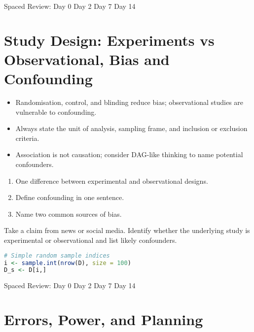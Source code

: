 \documentclass[11pt,a4paper]{article}
\def\textbf#1{#1}%
\newcommand{\reviewticks}{
  \vspace{0.4em}
  \noindent\scriptsize\textbf{Spaced Review:}
  \fbox{\phantom{D0}} Day 0\quad
  \fbox{\phantom{D2}} Day 2\quad
  \fbox{\phantom{D7}} Day 7\quad
  \fbox{\phantom{D14}} Day 14
}
\begin{document}
\reviewticks

\section{Study Design: Experiments vs Observational, Bias and Confounding}

\begin{corebox}
\begin{itemize}
  \item Randomisation, control, and blinding reduce bias; observational studies are vulnerable to confounding.
  \item Always state the unit of analysis, sampling frame, and inclusion or exclusion criteria.
  \item Association is not causation; consider DAG-like thinking to name potential confounders.
\end{itemize}
\end{corebox}

\begin{recallbox}
\begin{enumerate}
  \item One difference between experimental and observational designs.
  \item Define confounding in one sentence.
  \item Name two common sources of bias.
\end{enumerate}
\end{recallbox}

\begin{practicebox}
Take a claim from news or social media. Identify whether the underlying study is experimental or observational and list likely confounders.
\end{practicebox}

\begin{rbox}
\begin{lstlisting}[language=R]
# Simple random sample indices
i <- sample.int(nrow(D), size = 100)
D_s <- D[i,]
\end{lstlisting}
\end{rbox}

\reviewticks

\section{Errors, Power, and Planning}
\end{document}

